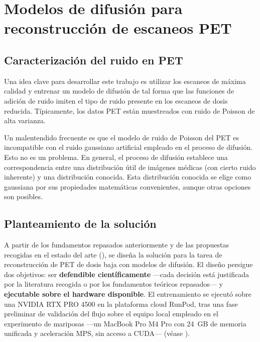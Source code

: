 \chapter{Modelos de difusión para reconstrucción de escaneos PET}
\label{cap:pet}

\section{Caracterización del ruido en PET}
\label{sec:pet-ruido}

Una idea clave para desarrollar este trabajo es utilizar los
escaneos de máxima calidad y entrenar un modelo de difusión de
tal forma que las funciones de adición de ruido imiten el tipo
de ruido presente en los escaneos de dosis reducida. Típicamente,
los datos PET están muestreados con ruido de Poisson de alta
varianza.

Un malentendido frecuente es que el modelo de ruido de Poisson
del PET es incompatible con el ruido gaussiano artificial empleado
en el proceso de difusión. Esto no es un problema. En general,
el proceso de difusión establece una correspondencia entre una
distribución útil de imágenes médicas (con cierto ruido inherente)
y una distribución conocida. Esta distribución conocida se elige
como gaussiana por sus propiedades matemáticas convenientes,
aunque otras opciones son posibles.

\section{Planteamiento de la solución}
\label{sec:pet-planteamiento}

A partir de los fundamentos repasados anteriormente y de las
propuestas recogidas en el estado del arte
(), se diseña la solución para la tarea
de reconstrucción de PET de dosis baja con modelos de difusión.
El diseño persigue dos objetivos: ser \textbf{defendible
científicamente} —cada decisión está justificada por la literatura
recogida o por los fundamentos teóricos repasados— y
\textbf{ejecutable sobre el hardware disponible}. El
entrenamiento se ejecutó sobre una NVIDIA RTX PRO 4500 en la
plataforma cloud RunPod, tras una fase preliminar de validación
del flujo sobre el equipo local empleado en el experimento de
mariposas —un MacBook Pro M4 Pro con 24~GB de memoria unificada y
aceleración MPS, sin acceso a CUDA— (véase
).


